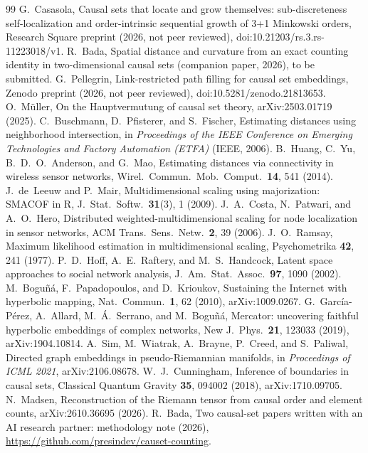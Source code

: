 \documentclass[prd,twocolumn,superscriptaddress,nofootinbib,amsmath,amssymb,floatfix]{revtex4-2}
\begin{document}
\begin{thebibliography}{99}
 G.~Casasola, Causal sets that locate and grow themselves: sub-discreteness self-localization and order-intrinsic sequential growth of 3+1 Minkowski orders, Research Square preprint (2026, not peer reviewed), doi:10.21203/rs.3.rs-11223018/v1.
 R.~Bada, Spatial distance and curvature from an exact counting identity in two-dimensional causal sets (companion paper, 2026), to be submitted.
 G.~Pellegrin, Link-restricted path filling for causal set embeddings, Zenodo preprint (2026, not peer reviewed), doi:10.5281/zenodo.21813653.
 O.~M\"uller, On the Hauptvermutung of causal set theory, arXiv:2503.01719 (2025).
 C.~Buschmann, D.~Pfisterer, and S.~Fischer, Estimating distances using neighborhood intersection, in \emph{Proceedings of the IEEE Conference on Emerging Technologies and Factory Automation (ETFA)} (IEEE, 2006).
 B.~Huang, C.~Yu, B.~D.~O.~Anderson, and G.~Mao, Estimating distances via connectivity in wireless sensor networks, Wirel.\ Commun.\ Mob.\ Comput.\ \textbf{14}, 541 (2014).
 J.~de~Leeuw and P.~Mair, Multidimensional scaling using majorization: SMACOF in R, J.\ Stat.\ Softw.\ \textbf{31}(3), 1 (2009).
 J.~A.~Costa, N.~Patwari, and A.~O.~Hero, Distributed weighted-multidimensional scaling for node localization in sensor networks, ACM Trans.\ Sens.\ Netw.\ \textbf{2}, 39 (2006).
 J.~O.~Ramsay, Maximum likelihood estimation in multidimensional scaling, Psychometrika \textbf{42}, 241 (1977).
 P.~D.~Hoff, A.~E.~Raftery, and M.~S.~Handcock, Latent space approaches to social network analysis, J.\ Am.\ Stat.\ Assoc.\ \textbf{97}, 1090 (2002).
 M.~Bogu\~n\'a, F.~Papadopoulos, and D.~Krioukov, Sustaining the Internet with hyperbolic mapping, Nat.\ Commun.\ \textbf{1}, 62 (2010), arXiv:1009.0267.
 G.~Garc\'ia-P\'erez, A.~Allard, M.~\'A.~Serrano, and M.~Bogu\~n\'a, Mercator: uncovering faithful hyperbolic embeddings of complex networks, New J.\ Phys.\ \textbf{21}, 123033 (2019), arXiv:1904.10814.
 A.~Sim, M.~Wiatrak, A.~Brayne, P.~Creed, and S.~Paliwal, Directed graph embeddings in pseudo-Riemannian manifolds, in \emph{Proceedings of ICML 2021}, arXiv:2106.08678.
 W.~J.~Cunningham, Inference of boundaries in causal sets, Classical Quantum Gravity \textbf{35}, 094002 (2018), arXiv:1710.09705.
 N.~Madsen, Reconstruction of the Riemann tensor from causal order and element counts, arXiv:2610.36695 (2026).
 R.~Bada, Two causal-set papers written with an AI research partner: methodology note (2026), \url{https://github.com/presindev/causet-counting}.
\end{thebibliography}
\end{document}
